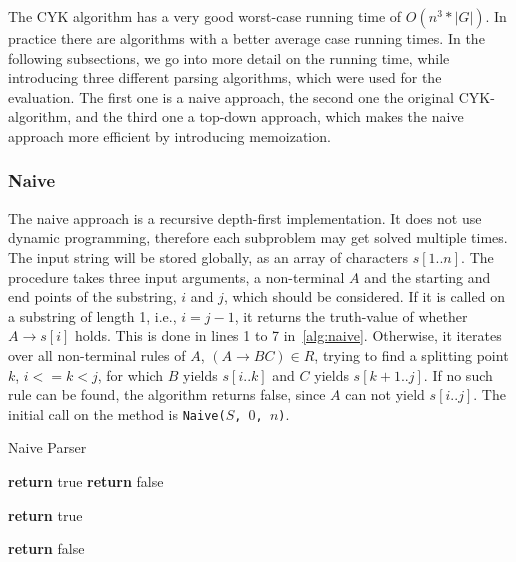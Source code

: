 The CYK algorithm has a very good worst-case running time of $O(n^3 * |G|)$.
In practice there are algorithms with a better average case running times.
In the following subsections, we go into more detail on the running time, while introducing three different parsing algorithms, which were used for the evaluation.
The first one is a naive approach, the second one the original CYK-algorithm, and the third one a top-down approach, which makes the naive approach more efficient by introducing memoization.



\subsubsection{Naive}

The naive approach is a recursive depth-first implementation.
It does not use dynamic programming, therefore each subproblem may get solved multiple times.
The input string will be stored globally, as an array of characters $s[1..n]$.
The procedure takes three input arguments, a non-terminal $A$ and the starting and end points of the substring, $i$ and $j$, which should be considered.
If it is called on a substring of length 1, i.e., $i = j-1$, it returns the truth-value of whether $A\rightarrow s[i]$ holds.
This is done in lines 1 to 7 in~\ref{alg:naive}.
Otherwise, it iterates over all non-terminal rules of $A$, $(A\rightarrow BC) \in R$, trying to find a splitting point $k$, $i <= k < j$, for which $B$ yields $s[i..k]$ and $C$ yields $s[k+1..j]$.
If no such rule can be found, the algorithm returns false, since $A$ can not yield $s[i..j]$.
The initial call on the method is \texttt{Naive($S$, $0$, $n$)}.

\begin{algorithm}[H]
    \caption{Naive Parser}
    \label{alg:naive}
    \begin{algorithmic}[1]
                \State \textbf{return} true
            \Else
                \State \textbf{return} false
            \EndIf
        \EndIf

                    \State \textbf{return} true
                \EndIf
            \EndFor
        \EndFor

        \State \textbf{return} false
        \EndProcedure
    \end{algorithmic}
\end{algorithm}

